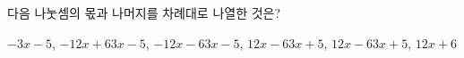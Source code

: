 다음 나눗셈의 몫과 나머지를 차례대로 나열한 것은?
\begin{choicesii}{$-3x-5$, $-12x+6$}{$3x-5$, $-12x-6$}{$3x-5$, $12x-6$}{$3x+5$, $12x-6$}{$3x+5$, $12x+6$}\end{choicesii}
